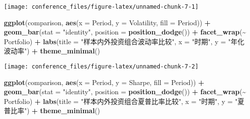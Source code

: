 \documentclass[
]{article}
\newenvironment{Shaded}{\begin{snugshade}}{\end{snugshade}}
\newcommand{\AttributeTok}[1]{\textcolor[rgb]{0.13,0.29,0.53}{#1}}
\newcommand{\FunctionTok}[1]{\textcolor[rgb]{0.13,0.29,0.53}{\textbf{#1}}}
\newcommand{\NormalTok}[1]{#1}
\newcommand{\SpecialCharTok}[1]{\textcolor[rgb]{0.81,0.36,0.00}{\textbf{#1}}}
\newcommand{\StringTok}[1]{\textcolor[rgb]{0.31,0.60,0.02}{#1}}
\begin{document}
\begin{center}\texttt{[image: conference\_files/figure-latex/unnamed-chunk-7-1]} \end{center}

\begin{Shaded}
\begin{Highlighting}[]
\FunctionTok{ggplot}\NormalTok{(comparison, }\FunctionTok{aes}\NormalTok{(}\AttributeTok{x =}\NormalTok{ Period, }\AttributeTok{y =}\NormalTok{ Volatility, }\AttributeTok{fill =}\NormalTok{ Period)) }\SpecialCharTok{+}
  \FunctionTok{geom\_bar}\NormalTok{(}\AttributeTok{stat =} \StringTok{"identity"}\NormalTok{, }\AttributeTok{position =} \FunctionTok{position\_dodge}\NormalTok{()) }\SpecialCharTok{+}
  \FunctionTok{facet\_wrap}\NormalTok{(}\SpecialCharTok{\textasciitilde{}}\NormalTok{ Portfolio) }\SpecialCharTok{+}
  \FunctionTok{labs}\NormalTok{(}\AttributeTok{title =} \StringTok{"样本内外投资组合波动率比较"}\NormalTok{,}
       \AttributeTok{x =} \StringTok{"时期"}\NormalTok{,}
       \AttributeTok{y =} \StringTok{"年化波动率"}\NormalTok{) }\SpecialCharTok{+}
  \FunctionTok{theme\_minimal}\NormalTok{()}
\end{Highlighting}
\end{Shaded}

\begin{center}\texttt{[image: conference\_files/figure-latex/unnamed-chunk-7-2]} \end{center}

\begin{Shaded}
\begin{Highlighting}[]
\FunctionTok{ggplot}\NormalTok{(comparison, }\FunctionTok{aes}\NormalTok{(}\AttributeTok{x =}\NormalTok{ Period, }\AttributeTok{y =}\NormalTok{ Sharpe, }\AttributeTok{fill =}\NormalTok{ Period)) }\SpecialCharTok{+}
  \FunctionTok{geom\_bar}\NormalTok{(}\AttributeTok{stat =} \StringTok{"identity"}\NormalTok{, }\AttributeTok{position =} \FunctionTok{position\_dodge}\NormalTok{()) }\SpecialCharTok{+}
  \FunctionTok{facet\_wrap}\NormalTok{(}\SpecialCharTok{\textasciitilde{}}\NormalTok{ Portfolio) }\SpecialCharTok{+}
  \FunctionTok{labs}\NormalTok{(}\AttributeTok{title =} \StringTok{"样本内外投资组合夏普比率比较"}\NormalTok{,}
       \AttributeTok{x =} \StringTok{"时期"}\NormalTok{,}
       \AttributeTok{y =} \StringTok{"夏普比率"}\NormalTok{) }\SpecialCharTok{+}
  \FunctionTok{theme\_minimal}\NormalTok{()}
\end{Highlighting}
\end{Shaded}
\end{document}
